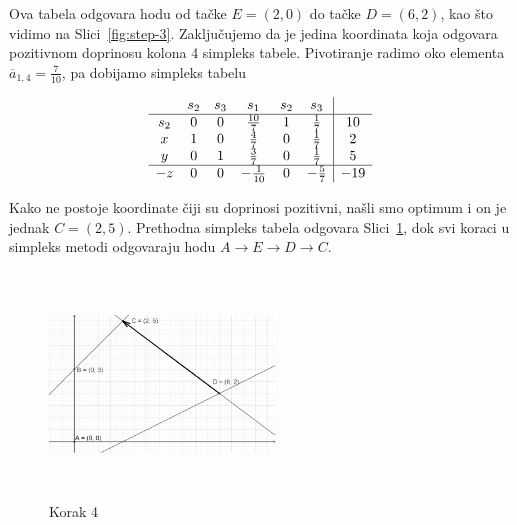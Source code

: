 \documentclass[a4paper, utf8, 11pt, colorlinks]{book}
\begin{document}
Ova tabela odgovara hodu od tačke $E=(2,0)$ do tačke $D=(6,2)$, kao što vidimo na Slici~\ref{fig:step-3}.
Zaključujemo da je jedina koordinata koja odgovara pozitivnom doprinosu kolona 
4 simpleks tabele. Pivotiranje radimo oko elementa $\overline{a}_{1,4} = \frac{7}{10}$, pa dobijamo simpleks tabelu 

$$\begin{array}{cccccc| c}
	& s_2  & s_3   & s_1  & s_2 & s_3 &     \\ \hline
s_2 &  0   &  0    & \frac{10}{7}    &  1   & \frac{1}{7}   & 10 \\
x   &  1   &  0    &  \frac{4}{7}    &  0   & \frac{1}{7}  & 2 \\
y   &  0   &  1    &  \frac{3}{7}    &  0   & \frac{1}{7}   & 5  \\ \hline
-z  &  0   &  0   &   -\frac{1}{10}  & 0    &  -\frac{5}{7} & -19 \\
\end{array}
$$ 

Kako ne postoje koordinate čiji su doprinosi pozitivni, našli smo optimum i on je jednak 
$C=(2,5)$. Prethodna simpleks tabela odgovara Slici~\ref{fig:step-4}, dok svi koraci u simpleks metodi odgovaraju 
hodu $A \rightarrow E \rightarrow D \rightarrow C$. 

\begin{figure}[H]
	\centering
	\includegraphics[width=170pt, height=170pt]{simpleks-primjer-2-sl4.eps}
	\caption{Korak 4}
	\label{fig:step-4}
\end{figure}
\end{document}
